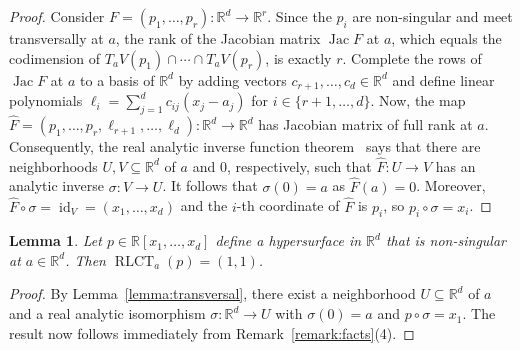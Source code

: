 \documentclass[11pt]{amsart}
\DeclareMathOperator{\rlct}{RLCT}
\DeclareMathOperator{\jac}{Jac}
\numberwithin{equation}{section}
\theoremstyle{plain}
\newtheorem{lemma}[theorem]{Lemma}
\theoremstyle{definition}
\newcommand{\R}{\mathbb{R}}
\begin{document}
\begin{proof}
    Consider $F = (p_1,\ldots,p_r): \R^d \to \R^r$. Since the $p_i$ are non-singular and meet transversally at $a$, the rank of the Jacobian matrix $\jac F$ at $a$, which equals the codimension of $T_a V(p_1) \cap \cdots \cap T_a V(p_r)$, is exactly $r$. Complete the rows of $\jac F$ at $a$ to a basis of $\R^d$ by adding vectors $c_{r+1},\ldots, c_d \in \R^d$ and define linear polynomials $\ell_i = \sum_{j = 1}^d c_{ij} (x_j - a_j)$ for $i \in \{r+1,\ldots,d\}$. Now, the map $\widehat{F} = (p_1,\ldots,p_r,\ell_{r+1},\ldots,\ell_d): \R^d \to \R^d$ has Jacobian matrix of full rank at $a$. Consequently, the real analytic inverse function theorem~\cite[Theorem 1.8.1]{KrantzParks2002} says that there are neighborhoods $U,V \subseteq \R^d$ of $a$ and $0$, respectively, such that $\widehat{F}: U \to V$ has an analytic inverse $\sigma: V \to U$. It follows that $\sigma(0) = a$ as $\widehat{F}(a) = 0$. Moreover, $\widehat{F} \circ \sigma = \operatorname{id}_V = (x_1,\ldots,x_d)$ and the $i$-th coordinate of $\widehat{F}$ is $p_i$, so $p_i \circ \sigma = x_i$.
\end{proof}


\begin{lemma}\label{lemma:regular}
    Let $p \in \R[x_1,\ldots,x_d]$ define a hypersurface in $\R^d$ that is non-singular at $a \in \R^d$. Then $\rlct_a(p) = (1,1)$.
\end{lemma}

\begin{proof}
    By Lemma~\ref{lemma:transversal}, there exist a neighborhood $U \subseteq \R^d$ of $a$ and a real analytic isomorphism $\sigma: \R^d \to U$ with $\sigma(0) = a$ and $p \circ \sigma = x_1$. The result now follows immediately from Remark~\ref{remark:facts}(4).
\end{proof}
\end{document}
